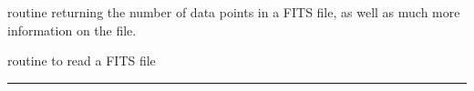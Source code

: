 \begin{related}
  \begin{sulist}{} %
  \item[\htmlref{getsize\_fits}{sub:getsize_fits}] routine returning the number
  of data points in a FITS file, as well as much more information on the file.
  \item[\htmlref{input\_map}{sub:input_map}] routine to read a \healpix FITS file
  \end{sulist}
\end{related}

\rule{\hsize}{2mm}

\newpage
